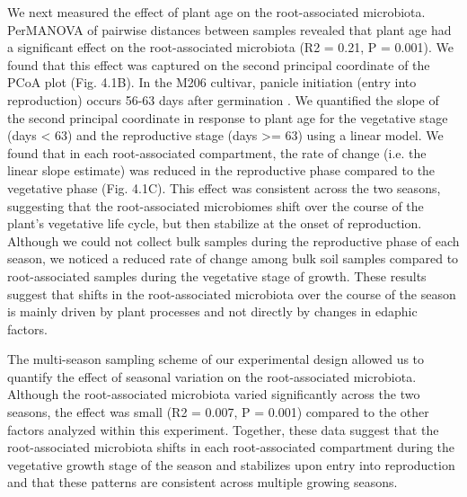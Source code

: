 We next measured the effect of plant age on the root-associated microbiota. PerMANOVA of pairwise distances between samples revealed that plant age had a significant effect on the root-associated microbiota (R2 = 0.21, P = 0.001). We found that this effect was captured on the second principal coordinate of the PCoA plot (Fig. 4.1B). In the M206 cultivar, panicle initiation (entry into reproduction) occurs 56-63 days after germination \cite{Linquist2012}. We quantified the slope of the second principal coordinate in response to plant age for the vegetative stage (days < 63) and the reproductive stage (days >= 63) using a linear model. We found that in each root-associated compartment, the rate of change (i.e. the linear slope estimate) was reduced in the reproductive phase compared to the vegetative phase (Fig. 4.1C). This effect was consistent across the two seasons, suggesting that the root-associated microbiomes shift over the course of the plant's vegetative life cycle, but then stabilize at the onset of reproduction. Although we could not collect bulk samples during the reproductive phase of each season, we noticed a reduced rate of change among bulk soil samples compared to root-associated samples during the vegetative stage of growth. These results suggest that shifts in the root-associated microbiota over the course of the season is mainly driven by plant processes and not directly by changes in edaphic factors.

The multi-season sampling scheme of our experimental design allowed us to quantify the effect of seasonal variation on the root-associated microbiota. Although the root-associated microbiota varied significantly across the two seasons, the effect was small (R2 = 0.007, P = 0.001) compared to the other factors analyzed within this experiment. Together, these data suggest that the root-associated microbiota shifts in each root-associated compartment during the vegetative growth stage of the season and stabilizes upon entry into reproduction and that these patterns are consistent across multiple growing seasons.

